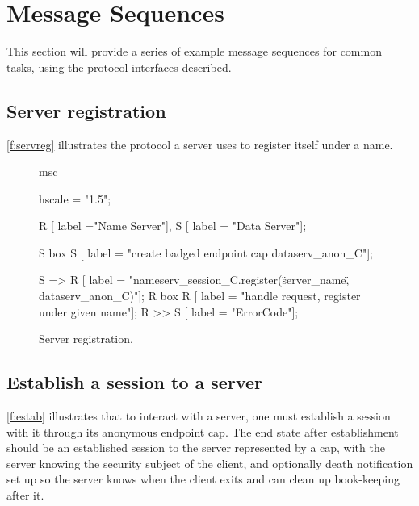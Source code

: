 %
%
%
%

\section{Message Sequences}

This section will provide a series of example message sequences for common tasks, using the protocol
interfaces described.

\subsection{Server registration}

\autoref{f:servreg} illustrates the protocol a server uses to register itself under a name.

\begin{figure}[htb]
\begin{center}
\begin{msc}
msc {
    hscale = "1.5";

    R [ label ="Name Server"],
    S [ label = "Data Server"];
    
    S box S [ label = "create badged endpoint cap dataserv\_anon\_C"];
 
    S => R [ label = "nameserv\_session\_C.register(\"server\_name\", dataserv\_anon\_C)"];
    R box R [ label = "handle request, register under given name"];
    R >> S [ label = "ErrorCode"];
}
\end{msc}
\end{center}
\caption{Server registration.}
\label{f:servreg}
\end{figure}

\subsection{Establish a session to a server}


\autoref{f:estab} illustrates that to interact with a server, one must establish a session with it
through its anonymous endpoint cap. The end state after establishment should be an established
session to the server represented by a  cap, with the server knowing the security
subject of the client, and optionally death notification set up so the server knows when the
client exits and can clean up book-keeping after it.

